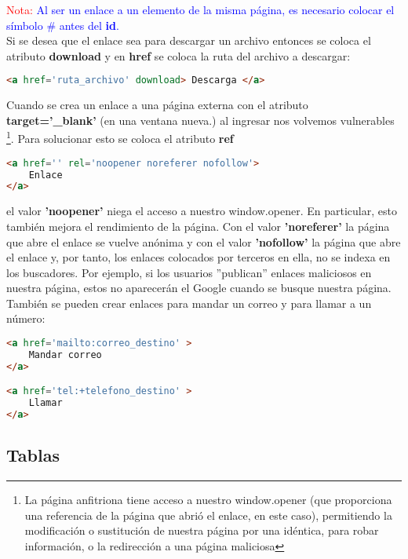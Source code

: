 \documentclass[10pt,oneside]{article}
\begin{document}
\begin{multicols}{2}
    \textcolor{red}{Nota:} \textcolor{blue}{Al ser un enlace a un elemento de la misma página, es necesario colocar el símbolo \# antes del \textbf{id}.} \\ \newline Si se desea que el enlace sea para descargar un archivo entonces se coloca el atributo \textbf{download} y en \textbf{href} se coloca la ruta del archivo a descargar:
        
    \begin{lstlisting}[language=HTML]
<a href='ruta_archivo' download> Descarga </a>
    \end{lstlisting}

    Cuando se crea un enlace a una página externa con el atributo \textbf{target='\_blank'} (en una ventana nueva.) al ingresar nos volvemos vulnerables \footnote{La página anfitriona tiene acceso a nuestro window.opener  (que proporciona una referencia de la página que abrió el enlace, en este caso), permitiendo la modificación o sustitución de nuestra página por una idéntica, para robar información, o la redirección a una página maliciosa}. Para solucionar esto se coloca el atributo \textbf{ref}
    
    \begin{lstlisting}[language=HTML]
<a href='' rel='noopener noreferer nofollow'>
    Enlace
</a>
    \end{lstlisting}
    
    el valor \textbf{'noopener'}  niega el acceso a nuestro window.opener. En particular, esto también mejora el rendimiento de la página. Con el valor \textbf{'noreferer'} la página que abre el enlace se vuelve anónima y con el valor \textbf{'nofollow'} la página que abre el enlace y, por tanto, los enlaces colocados por terceros en ella,  no se indexa en los buscadores. Por ejemplo, si los usuarios ''publican'' enlaces maliciosos en nuestra página, estos no aparecerán el Google cuando se busque nuestra página.\\\newline
    También se pueden crear enlaces para mandar un correo y para llamar a un número:

    \begin{lstlisting}[language=HTML]
<a href='mailto:correo_destino' >
    Mandar correo
</a>

<a href='tel:+telefono_destino' >
    Llamar
</a>
    \end{lstlisting}

\subsection{Tablas}


\end{multicols}
\end{document}
